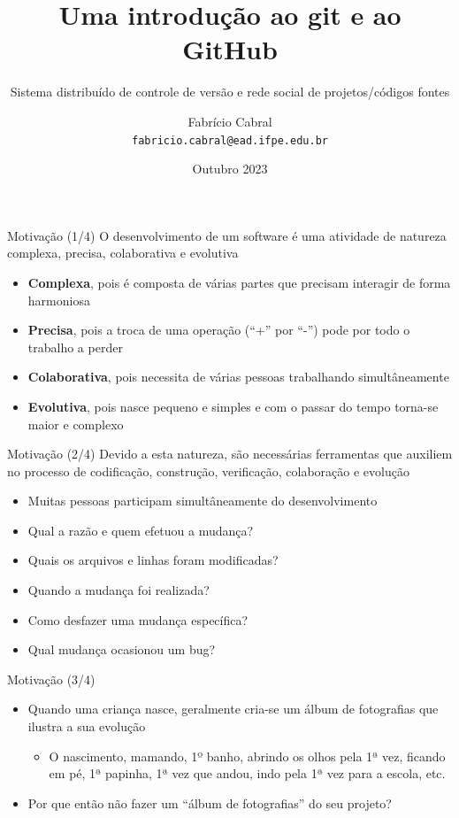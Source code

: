 \documentclass[14pt]{beamer}
\title{Uma introdução ao git e ao GitHub}
\subtitle{Sistema distribuído de controle de versão e rede social de 
projetos/códigos fontes}
\date{Outubro 2023}
\author[Fabrício Cabral]{
    Fabrício Cabral\texorpdfstring{\\\texttt{fabricio.cabral@ead.ifpe.edu.br}}{}
}
\institute{IFPE}
\begin{document}
\titlepage

\begin{frame}{Motivação (1/4)}
O desenvolvimento de um software é uma atividade de natureza complexa, precisa,
colaborativa e evolutiva
\begin{itemize}
    \item \textbf{Complexa}, pois é composta de várias partes que precisam
    interagir de forma harmoniosa
    \item \textbf{Precisa}, pois a troca de uma operação (``+'' por ``-'') pode
    por todo o trabalho a perder
    \item \textbf{Colaborativa}, pois necessita de várias pessoas trabalhando
    simultâneamente
    \item \textbf{Evolutiva}, pois nasce pequeno e simples e com o passar do
    tempo torna-se maior e complexo        
\end{itemize}
\end{frame}

\begin{frame}{Motivação (2/4)}
Devido a esta natureza, são necessárias ferramentas que auxiliem no processo de
codificação, construção, verificação, colaboração e evolução
\begin{itemize}
    \item Muitas pessoas participam simultâneamente do desenvolvimento
    \item Qual a razão e quem efetuou a mudança?
    \item Quais os arquivos e linhas foram modificadas?
    \item Quando a mudança foi realizada?
    \item Como desfazer uma mudança específica?
    \item Qual mudança ocasionou um bug?
\end{itemize}
\end{frame}

\begin{frame}{Motivação (3/4)}
\begin{itemize}
    \item Quando uma criança nasce, geralmente cria-se um álbum de fotografias
    que ilustra a sua evolução
    \begin{itemize}
        \item O nascimento, mamando, 1º banho, abrindo os olhos pela 1ª vez,
        ficando em pé, 1ª papinha, 1ª vez que andou, indo pela 1ª vez para a
        escola, etc.
    \end{itemize}
    \item Por que então não fazer um ``álbum de fotografias'' do seu projeto?
  \end{itemize}
\end{frame}
\end{document}

